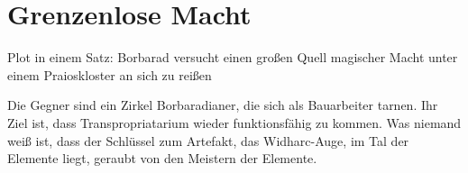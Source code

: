 \section{Grenzenlose Macht}

Plot in einem Satz: Borbarad versucht einen großen Quell magischer Macht unter einem Praioskloster an sich zu reißen

Die Gegner sind ein Zirkel Borbaradianer, die sich als Bauarbeiter tarnen. Ihr Ziel ist, dass Transpropriatarium wieder funktionsfähig zu kommen. Was niemand weiß ist, dass der Schlüssel zum Artefakt, das Widharc-Auge, im Tal der Elemente liegt, geraubt von den Meistern der Elemente. 